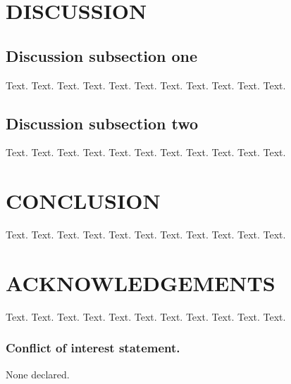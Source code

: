 \documentclass[a4,center,fleqn]{NAR}
\begin{document}
\section{DISCUSSION}

\subsection{Discussion subsection one}

Text. Text. Text. Text. Text. Text. Text. Text. Text. Text. Text.

\subsection{Discussion subsection two}

Text. Text. Text. Text. Text. Text. Text. Text. Text. Text. Text.

\section{CONCLUSION}

Text. Text. Text. Text. Text. Text. Text. Text. Text. Text. Text.

\section{ACKNOWLEDGEMENTS}

Text. Text. Text. Text. Text. Text. Text. Text. Text. Text. Text.


\subsubsection{Conflict of interest statement.} None declared.
\newpage


\end{document}
